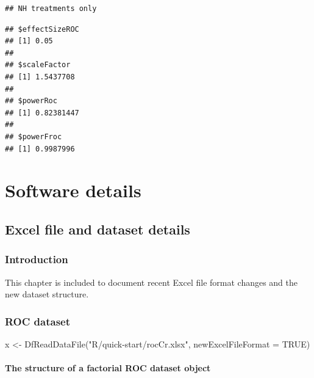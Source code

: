 \documentclass[
]{book}
\newenvironment{Shaded}{\begin{snugshade}}{\end{snugshade}}
\newcommand{\AttributeTok}[1]{\textcolor[rgb]{0.77,0.63,0.00}{#1}}
\newcommand{\ConstantTok}[1]{\textcolor[rgb]{0.00,0.00,0.00}{#1}}
\newcommand{\FunctionTok}[1]{\textcolor[rgb]{0.00,0.00,0.00}{#1}}
\newcommand{\NormalTok}[1]{#1}
\newcommand{\OtherTok}[1]{\textcolor[rgb]{0.56,0.35,0.01}{#1}}
\newcommand{\StringTok}[1]{\textcolor[rgb]{0.31,0.60,0.02}{#1}}
\begin{document}
\begin{verbatim}
## NH treatments only
\end{verbatim}

\begin{verbatim}
## $effectSizeROC
## [1] 0.05
## 
## $scaleFactor
## [1] 1.5437708
## 
## $powerRoc
## [1] 0.82381447
## 
## $powerFroc
## [1] 0.9987996
\end{verbatim}

\hypertarget{part-software-details}{%
\part*{Software details}\label{part-software-details}}

\hypertarget{dataset-object-details}{%
\chapter{Excel file and dataset details}\label{dataset-object-details}}

\hypertarget{introduction-1}{%
\section{Introduction}\label{introduction-1}}

This chapter is included to document recent Excel file format changes and the new dataset structure.

\hypertarget{dataset-object-details-roc-dataset}{%
\section{ROC dataset}\label{dataset-object-details-roc-dataset}}

\begin{Shaded}
\begin{Highlighting}[]
\NormalTok{x }\OtherTok{\textless{}{-}} \FunctionTok{DfReadDataFile}\NormalTok{(}\StringTok{"R/quick{-}start/rocCr.xlsx"}\NormalTok{, }\AttributeTok{newExcelFileFormat =} \ConstantTok{TRUE}\NormalTok{)}
\end{Highlighting}
\end{Shaded}

\hypertarget{dataset-object-details-structure-roc-dataset}{%
\subsection{The structure of a factorial ROC dataset object}\label{dataset-object-details-structure-roc-dataset}}
\end{document}

